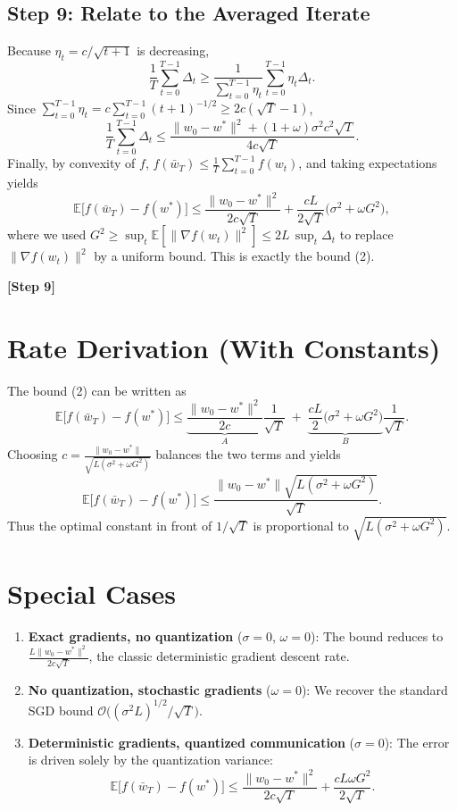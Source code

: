 \documentclass{article}
\newcommand{\E}{\mathbb{E}}
\begin{document}
\subsection*{Step 9: Relate to the Averaged Iterate}
Because $\eta_{t}=c/\sqrt{t+1}$ is decreasing,
\[
\frac{1}{T}\sum_{t=0}^{T-1}\Delta_{t}
\ge \frac{1}{\sum_{t=0}^{T-1}\eta_{t}}\sum_{t=0}^{T-1}\eta_{t}\Delta_{t}.
\]
Since $\sum_{t=0}^{T-1}\eta_{t}=c\sum_{t=0}^{T-1}(t+1)^{-1/2}\ge 2c(\sqrt{T}-1)$,
\[
\frac{1}{T}\sum_{t=0}^{T-1}\Delta_{t}
\le \frac{ \|w_{0}-w^{*}\|^{2}+ (1+\omega)\sigma^{2}c^{2}\sqrt{T}}{4c\sqrt{T}}.
\]
Finally, by convexity of $f$, $f(\bar w_{T})\le \frac1T\sum_{t=0}^{T-1}f(w_{t})$, and taking expectations yields
\[
\E\!\big[f(\bar w_{T})-f(w^{*})\big]
\le \frac{\|w_{0}-w^{*}\|^{2}}{2c\sqrt{T}}
+\frac{cL}{2\sqrt{T}}\big(\sigma^{2}+ \omega G^{2}\big),
\]
where we used $G^{2}\ge \sup_{t}\E[\|\nabla f(w_{t})\|^{2}]\le 2L\,\sup_{t}\Delta_{t}$ to replace $\|\nabla f(w_{t})\|^{2}$ by a uniform bound. This is exactly the bound (2). \qedhere

\textbf{[Step 9]}

\section*{Rate Derivation (With Constants)}
The bound (2) can be written as
\[
\E\!\big[f(\bar w_{T})-f(w^{*})\big]\le
\underbrace{\frac{\|w_{0}-w^{*}\|^{2}}{2c}}_{A}\frac{1}{\sqrt{T}}
\;+\;
\underbrace{\frac{cL}{2}\big(\sigma^{2}+ \omega G^{2}\big)}_{B}\frac{1}{\sqrt{T}}.
\]
Choosing $c=\frac{\|w_{0}-w^{*}\|}{\sqrt{L(\sigma^{2}+\omega G^{2})}}$ balances the two terms and yields
\[
\E\!\big[f(\bar w_{T})-f(w^{*})\big]\le
\frac{\|w_{0}-w^{*}\|\sqrt{L(\sigma^{2}+\omega G^{2})}}{\sqrt{T}}.
\]
Thus the optimal constant in front of $1/\sqrt{T}$ is proportional to $\sqrt{L(\sigma^{2}+\omega G^{2})}$.

\section*{Special Cases}
\begin{enumerate}
\item \textbf{Exact gradients, no quantization} ($\sigma=0$, $\omega=0$):  
The bound reduces to $\frac{L\|w_{0}-w^{*}\|^{2}}{2c\sqrt{T}}$, the classic deterministic gradient descent rate.

\item \textbf{No quantization, stochastic gradients} ($\omega=0$):  
We recover the standard SGD bound $\mathcal{O}\!\big((\sigma^{2}L)^{1/2} / \sqrt{T}\big)$.

\item \textbf{Deterministic gradients, quantized communication} ($\sigma=0$):  
The error is driven solely by the quantization variance:
\[
\E\!\big[f(\bar w_{T})-f(w^{*})\big]\le
\frac{\|w_{0}-w^{*}\|^{2}}{2c\sqrt{T}}+
\frac{cL\omega G^{2}}{2\sqrt{T}}.
\]
\end{enumerate}
\end{document}
